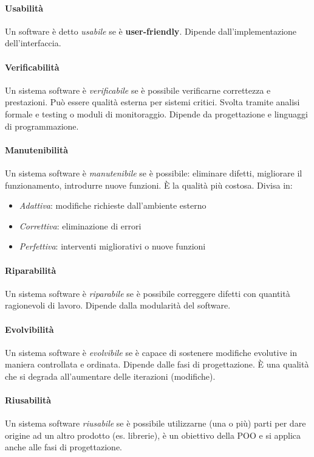 \paragraph{Usabilità} Un software è detto \textit{usabile} se è \textbf{user-friendly}. Dipende dall'implementazione dell'interfaccia.

\paragraph{Verificabilità} Un sistema software è \textit{verificabile} se è possibile verificarne correttezza e prestazioni. Può essere qualità esterna per sistemi critici. Svolta tramite analisi formale e testing o moduli di monitoraggio. Dipende da progettazione e linguaggi di programmazione.

\paragraph{Manutenibilità} Un sistema software è \textit{manutenibile} se è possibile: eliminare difetti, migliorare il funzionamento, introdurre nuove funzioni. È la qualità più costosa. Divisa in:
\begin{itemize}
    \item \textit{Adattiva}: modifiche richieste dall'ambiente esterno
    \item \textit{Correttiva}: eliminazione di errori
    \item \textit{Perfettiva}: interventi migliorativi o nuove funzioni
\end{itemize}

\paragraph{Riparabilità} Un sistema software è \textit{riparabile} se è possibile correggere difetti con quantità ragionevoli di lavoro. Dipende dalla modularità del software.

\paragraph{Evolvibilità} Un sistema software è \textit{evolvibile} se è capace di sostenere modifiche evolutive in maniera controllata e ordinata. Dipende dalle fasi di progettazione. È una qualità che si degrada all'aumentare delle iterazioni (modifiche).

\paragraph{Riusabilità} Un sistema software \textit{riusabile} se è possibile utilizzarne (una o più) parti per dare origine ad un altro prodotto (es. librerie), è un obiettivo della POO e si applica anche alle fasi di progettazione.

